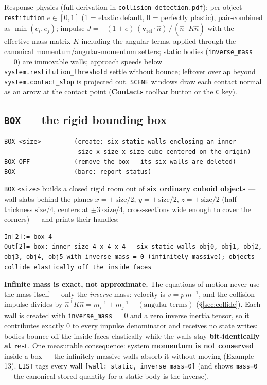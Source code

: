 \documentclass[11pt]{article}
\newcommand{\kw}[1]{\texttt{\uppercase{#1}}}
\newcommand{\code}[1]{\texttt{#1}}
\begin{document}
Response physics (full derivation in \code{collision\_detection.pdf}):
per-object \code{restitution} $e \in [0,1]$ (1 = elastic default, 0 =
perfectly plastic), pair-combined as $\min(e_i, e_j)$; impulse
$J = -(1+e)\,(\mathbf v_{\mathrm{rel}}\cdot\hat n)\,/\,(\hat n^{\!\top}
K \hat n)$ with the effective-mass matrix $K$ including the angular
terms, applied through the canonical momentum/angular-momentum setters;
static bodies (\code{inverse\_mass} $= 0$) are immovable walls;
approach speeds below \code{system.restitution\_threshold} settle
without bounce; leftover overlap beyond \code{system.contact\_slop} is
projected out. \kw{scene} windows draw each contact normal as an arrow
at the contact point (\textbf{Contacts} toolbar button or the \code{C}
key).

\subsection{\kw{box} --- the rigid bounding box}
\label{sec:box}

\begin{lstlisting}
BOX <size>         (create: six static walls enclosing an inner
                    size x size x size cube centered on the origin)
BOX OFF            (remove the box - its six walls are deleted)
BOX                (bare: report status)
\end{lstlisting}

\kw{box} \code{<size>} builds a closed rigid room out of \textbf{six
ordinary cuboid objects} --- wall slabs behind the planes
$x = \pm\,\mathrm{size}/2$, $y = \pm\,\mathrm{size}/2$,
$z = \pm\,\mathrm{size}/2$ (half-thickness $\mathrm{size}/4$, centers
at $\pm 3\cdot\mathrm{size}/4$, cross-sections wide enough to cover
the corners) --- and prints their handles:

\begin{lstlisting}
In[2]:= box 4
Out[2]= box: inner size 4 x 4 x 4 — six static walls obj0, obj1, obj2, obj3, obj4, obj5 with inverse_mass = 0 (infinitely massive); objects collide elastically off the inside faces
\end{lstlisting}

\textbf{Infinite mass is exact, not approximate.} The equations of
motion never use the mass itself --- only the \emph{inverse} mass:
velocity is $v = p\,m^{-1}$, and the collision impulse divides by
$\hat n^{\!\top}K\hat n = m_i^{-1} + m_j^{-1} + (\text{angular terms})$
(\S\ref{sec:collide}). Each wall is created with
\code{inverse\_mass} $= 0$ and a zero inverse inertia tensor, so it
contributes exactly 0 to every impulse denominator and receives no
state writes: bodies bounce off the inside faces elastically while the
walls stay \textbf{bit-identically at rest}. One measurable
consequence: system \textbf{momentum is not conserved} inside a box
--- the infinitely massive walls absorb it without moving
(Example 13). \kw{list} tags every wall
\code{[wall: static, inverse\_mass=0]} (and shows \code{mass=0} ---
the canonical stored quantity for a static body is the inverse).
\end{document}

